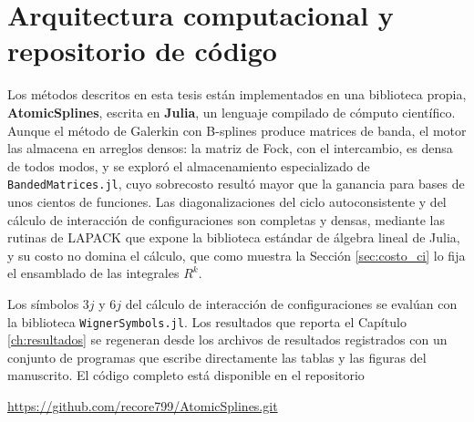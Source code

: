 \section{Arquitectura computacional y repositorio de código}
\label{sec:repositorio}

Los métodos descritos en esta tesis están implementados en una biblioteca propia, \textbf{AtomicSplines}, escrita en \textbf{Julia}, un lenguaje compilado de cómputo científico. Aunque el método de Galerkin con B-splines produce matrices de banda, el motor las almacena en arreglos densos: la matriz de Fock, con el intercambio, es densa de todos modos, y se exploró el almacenamiento especializado de \texttt{BandedMatrices.jl}, cuyo sobrecosto resultó mayor que la ganancia para bases de unos cientos de funciones. Las diagonalizaciones del ciclo autoconsistente y del cálculo de interacción de configuraciones son completas y densas, mediante las rutinas de LAPACK que expone la biblioteca estándar de álgebra lineal de Julia, y su costo no domina el cálculo, que como muestra la Sección \ref{sec:costo_ci} lo fija el ensamblado de las integrales $R^k$.

Los símbolos $3j$ y $6j$ del cálculo de interacción de configuraciones se evalúan con la biblioteca \texttt{WignerSymbols.jl}. Los resultados que reporta el Capítulo \ref{ch:resultados} se regeneran desde los archivos de resultados registrados con un conjunto de programas que escribe directamente las tablas y las figuras del manuscrito. El código completo está disponible en el repositorio

\begin{center}
    \url{https://github.com/recore799/AtomicSplines.git}
\end{center}
